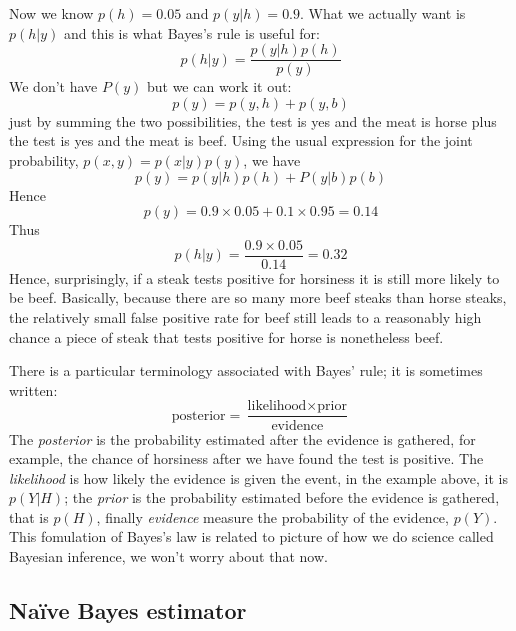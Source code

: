 \documentclass[12pt]{article}
\begin{document}
Now we know $p(h)=0.05$ and $p(y|h)=0.9$. What we actually want is
$p(h|y)$ and this is what Bayes's rule is useful for:
\begin{equation}
p(h|y)=\frac{p(y|h)p(h)}{p(y)}
\end{equation}
We don't have $P(y)$ but we can work it out:
\begin{equation}
  p(y)=p(y,h)+p(y,b)
\end{equation}
just by summing the two possibilities, the test is yes and the meat is horse plus the test is yes and the meat is beef. Using the usual expression for the joint probability, $p(x,y)=p(x|y)p(y)$, we have 
\begin{equation}
  p(y)=p(y|h)p(h)+P(y|b)p(b)
\end{equation}
Hence
\begin{equation}
p(y)=0.9\times 0.05 + 0.1\times 0.95=0.14
\end{equation}
Thus
\begin{equation}
p(h|y)=\frac{0.9\times 0.05}{0.14}=0.32
\end{equation}
Hence, surprisingly, if a steak tests positive for horsiness it is
still more likely to be beef. Basically, because there are so many
more beef steaks than horse steaks, the relatively small false
positive rate for beef still leads to a reasonably high chance a piece
of steak that tests positive for horse is nonetheless beef.

There is a particular terminology associated with Bayes' rule; it is
sometimes written:
\begin{equation}
\mbox{posterior}=\frac{\mbox{likelihood}\times \mbox{prior}}{\mbox{evidence}}
\end{equation}
The \textsl{posterior} is the probability estimated after the evidence
is gathered, for example, the chance of horsiness after we have found
the test is positive.  The \textsl{likelihood} is how likely the
evidence is given the event, in the example above, it is $p(Y|H)$; the
\textsl{prior} is the probability estimated before the evidence is
gathered, that is $p(H)$, finally \textsl{evidence} measure the
probability of the evidence, $p(Y)$. This fomulation of Bayes's law is
related to picture of how we do science called Bayesian inference, we won't worry about that now.

\subsection*{Na\"ive Bayes estimator}
\end{document}
